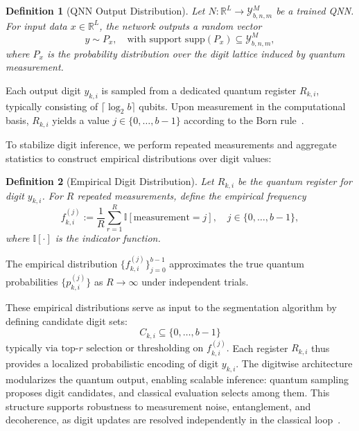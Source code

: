 \documentclass[aps,twocolumn,superscriptaddress,nofootinbib]{revtex4}
\newtheorem{definition}{Definition}
\begin{document}
\begin{definition}[QNN Output Distribution]
Let $N : \mathbb{R}^L \to \mathcal{Y}^M_{b,n,m}$ be a trained QNN. For input data $x \in \mathbb{R}^L$, the network outputs a random vector
\begin{equation}
y \sim P_x, \quad \text{with support } \text{supp}(P_x) \subseteq \mathcal{Y}^M_{b,n,m},
\end{equation}
where $P_x$ is the probability distribution over the digit lattice induced by quantum measurement.
\end{definition}

Each output digit $y_{k,i}$ is sampled from a dedicated quantum register $R_{k,i}$, typically consisting of $\lceil \log_2 b \rceil$ qubits. Upon measurement in the computational basis, $R_{k,i}$ yields a value $j \in \{0, \ldots, b-1\}$ according to the Born rule~\cite{peres1995quantum}.

To stabilize digit inference, we perform repeated measurements and aggregate statistics to construct empirical distributions over digit values:

\begin{definition}[Empirical Digit Distribution]
Let $R_{k,i}$ be the quantum register for digit $y_{k,i}$. For $R$ repeated measurements, define the empirical frequency
\begin{equation}
f^{(j)}_{k,i} := \frac{1}{R} \sum_{r=1}^{R} \mathbb{I}[\text{measurement} = j], \quad j \in \{0, \ldots, b-1\},
\end{equation}
where $\mathbb{I}[\cdot]$ is the indicator function.
\end{definition}

\noindent The empirical distribution $\{f^{(j)}_{k,i}\}_{j=0}^{b-1}$ approximates the true quantum probabilities $\{p^{(j)}_{k,i}\}$ as $R \to \infty$ under independent trials.

These empirical distributions serve as input to the segmentation algorithm by defining candidate digit sets:
\begin{equation}
C_{k,i} \subseteq \{0, \ldots, b - 1\}
\end{equation}
\noindent $\text{typically via top-$r$ selection or thresholding on } f^{(j)}_{k,i}.$ Each register $R_{k,i}$ thus provides a localized probabilistic encoding of digit $y_{k,i}$. The digitwise architecture modularizes the quantum output, enabling scalable inference: quantum sampling proposes digit candidates, and classical evaluation selects among them. This structure supports robustness to measurement noise, entanglement, and decoherence, as digit updates are resolved independently in the classical loop~\cite{schuld2020circuit,mitarai2018parameter}.
\end{document}
